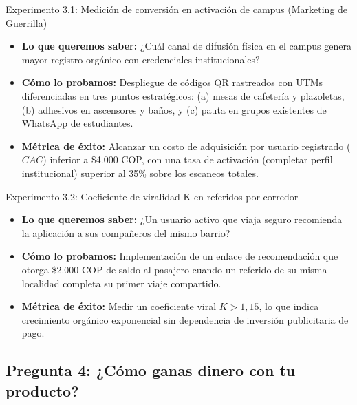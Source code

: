 \documentclass[11pt,a4paper]{article}
\begin{document}
\begin{kbibox}{Experimento 3.1: Medición de conversión en activación de campus (Marketing de Guerrilla)}
\begin{itemize}[leftmargin=*]
    \item \textbf{Lo que queremos saber:} ¿Cuál canal de difusión física en el campus genera mayor registro orgánico con credenciales institucionales?
    \item \textbf{Cómo lo probamos:} Despliegue de códigos QR rastreados con UTMs diferenciadas en tres puntos estratégicos: (a) mesas de cafetería y plazoletas, (b) adhesivos en ascensores y baños, y (c) pauta en grupos existentes de WhatsApp de estudiantes.
    \item \textbf{Métrica de éxito:} Alcanzar un costo de adquisición por usuario registrado ($CAC$) inferior a \$4.000 COP, con una tasa de activación (completar perfil institucional) superior al 35\% sobre los escaneos totales.
\end{itemize}
\end{kbibox}

\begin{kbibox}{Experimento 3.2: Coeficiente de viralidad K en referidos por corredor}
\begin{itemize}[leftmargin=*]
    \item \textbf{Lo que queremos saber:} ¿Un usuario activo que viaja seguro recomienda la aplicación a sus compañeros del mismo barrio?
    \item \textbf{Cómo lo probamos:} Implementación de un enlace de recomendación que otorga \$2.000 COP de saldo al pasajero cuando un referido de su misma localidad completa su primer viaje compartido.
    \item \textbf{Métrica de éxito:} Medir un coeficiente viral $K > 1,15$, lo que indica crecimiento orgánico exponencial sin dependencia de inversión publicitaria de pago.
\end{itemize}
\end{kbibox}

\subsection{Pregunta 4: ¿Cómo ganas dinero con tu producto?}
\end{document}
